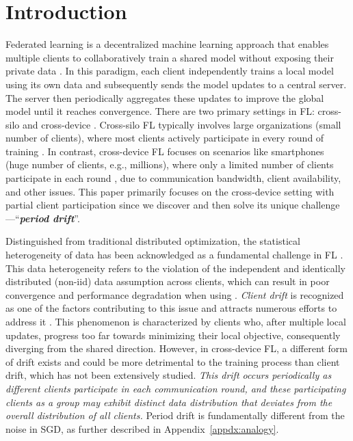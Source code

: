 \section{Introduction}\label{sec:intro}

Federated learning is a decentralized machine learning approach that enables multiple clients to collaboratively train a shared model without exposing their private data \citep{mcmahan2017communication}. In this paradigm, each client independently trains a local model using its own data and subsequently sends the model updates to a central server. The server then periodically aggregates these updates to improve the global model until it reaches convergence. There are two primary settings in FL: cross-silo and cross-device \citep{kairouz2021advances}. Cross-silo FL typically involves large organizations (small number of clients), where most clients actively participate in every round of training \citep{chen2021bridging,lin2020ensemble}. In contrast, cross-device FL focuses on scenarios like smartphones (huge number of clients, e.g., millions), where only a limited number of clients participate in each round \citep{li2020federated,reddi2020adaptive}, due to communication bandwidth, client availability, and other issues. This paper primarily focuses on the cross-device setting with partial client participation since we discover and then solve its unique challenge ---``\textbf{\textit{period drift}}''.

Distinguished from traditional distributed optimization, the statistical heterogeneity of data has been acknowledged as a fundamental challenge in FL \citep{li2020federatedb,chen2021bridging,lin2020ensemble}. This data heterogeneity refers to the violation of the independent and identically distributed (non-iid) data assumption across clients, which can result in poor convergence and performance degradation when using \fedavg. \textit{Client drift} is recognized as one of the factors contributing to this issue and attracts numerous efforts to address it \citep{karimireddy2021scaffold,li2020federated,reddi2020adaptive}. This phenomenon is characterized by clients who, after multiple local updates, progress too far towards minimizing their local objective, consequently diverging from the shared direction. However, in cross-device FL, a different form of drift exists and could be more detrimental to the training process than client drift, which has not been extensively studied. \textit{This drift occurs periodically as different clients participate in each communication round, and these participating clients as a group may exhibit distinct data distribution that deviates from the overall distribution of all clients.} 
Period drift is fundamentally different from the noise in SGD, as further described in Appendix~\ref{appdx:analogy}. 

